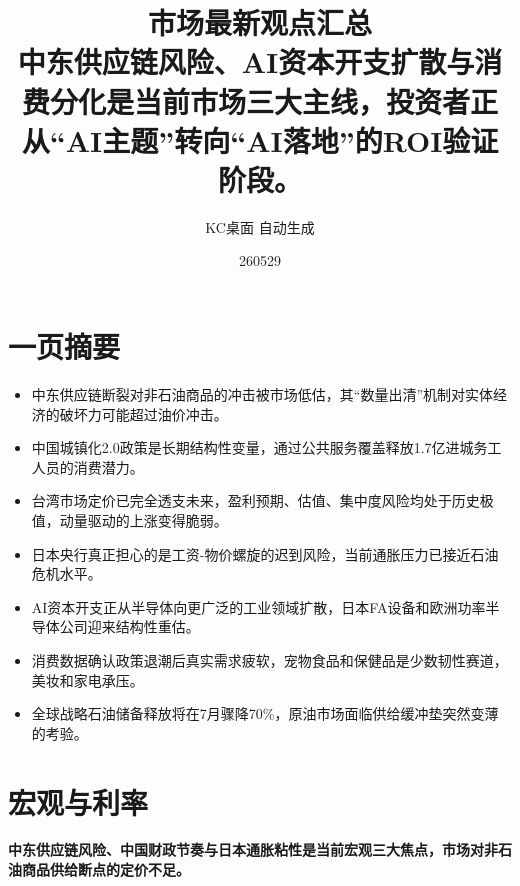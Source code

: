 \documentclass[11pt]{ctexart}
\title{\textbf{市场最新观点汇总}\\[0.4em]{\large 中东供应链风险、AI资本开支扩散与消费分化是当前市场三大主线，投资者正从“AI主题”转向“AI落地”的ROI验证阶段。}}
\author{KC桌面 自动生成}
\date{260529}
\begin{document}
\maketitle
\section*{一页摘要}
\begin{itemize}
  \item 中东供应链断裂对非石油商品的冲击被市场低估，其“数量出清”机制对实体经济的破坏力可能超过油价冲击。
  \item 中国城镇化2.0政策是长期结构性变量，通过公共服务覆盖释放1.7亿进城务工人员的消费潜力。
  \item 台湾市场定价已完全透支未来，盈利预期、估值、集中度风险均处于历史极值，动量驱动的上涨变得脆弱。
  \item 日本央行真正担心的是工资-物价螺旋的迟到风险，当前通胀压力已接近石油危机水平。
  \item AI资本开支正从半导体向更广泛的工业领域扩散，日本FA设备和欧洲功率半导体公司迎来结构性重估。
  \item 消费数据确认政策退潮后真实需求疲软，宠物食品和保健品是少数韧性赛道，美妆和家电承压。
  \item 全球战略石油储备释放将在7月骤降70\%，原油市场面临供给缓冲垫突然变薄的考验。
\end{itemize}
\section{宏观与利率}
\textbf{中东供应链风险、中国财政节奏与日本通胀粘性是当前宏观三大焦点，市场对非石油商品供给断点的定价不足。}
\end{document}
